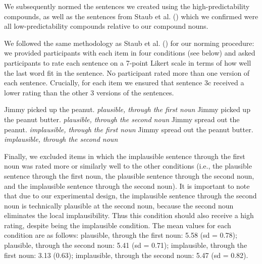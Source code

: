\documentclass[
  12pt,
  letterpaper,
]{scrreport}
\begin{document}
We subsequently normed the sentences we created using the
high-predictability compounds, as well as the sentences from Staub et
al. () which we
confirmed were all low-predictability compounds relative to our compound
nouns.

We followed the same methodology as Staub et al.
() for our norming
procedure: we provided participants with each item in four conditions
(see below) and asked participants to rate each sentence on a 7-point
Likert scale in terms of how well the last word fit in the sentence. No
participant rated more than one version of each sentence. Crucially, for
each item we ensured that sentence 3c received a lower rating than the
other 3 versions of the sentences.

\begin{exe}
\ex 
\begin{xlist}
\ex Jimmy picked up the peanut. \hfill \emph{plausible, through the first noun} 
\ex Jimmy picked up the peanut butter. \hfill \emph{plausible, through the second noun} 
\ex Jimmy spread out the peanut. \hfill \emph{implausible, through the first noun} 
\ex Jimmy spread out the peanut butter. \hfill \emph{implausible, through the second noun} 
\end{xlist}
\end{exe}

Finally, we excluded items in which the implausible sentence through the
first noun was rated more or similarly well to the other conditions
(i.e., the plausible sentence through the first noun, the plausible
sentence through the second noun, and the implausible sentence through
the second noun). It is important to note that due to our experimental
design, the implausible sentence through the second noun is technically
plausible at the second noun, because the second noun eliminates the
local implausibility. Thus this condition should also receive a high
rating, despite being the implausible condition. The mean values for
each condition are as follows: plausible, through the first noun: 5.58
(sd = 0.78); plausible, through the second noun: 5.41 (sd = 0.71);
implausible, through the first noun: 3.13 (0.63); implausible, through
the second noun: 5.47 (sd = 0.82).
\end{document}

